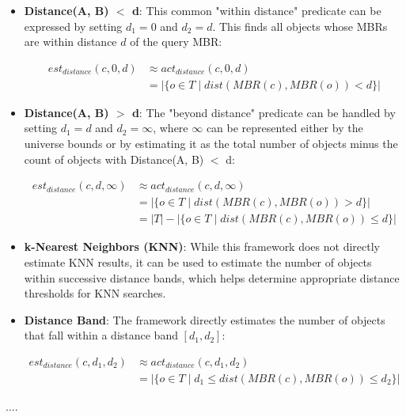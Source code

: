\documentclass{article}
\begin{document}
\begin{itemize}
\item \textbf{Distance(A, B) $<$ d}: This common "within distance" predicate can be expressed by setting $d_1 = 0$ and $d_2 = d$. This finds all objects whose MBRs are within distance $d$ of the query MBR:

\begin{align}
est_{distance}(c, 0, d) &\approx act_{distance}(c, 0, d) \\
&= |\{o \in T \mid dist(MBR(c), MBR(o)) < d\}|
\end{align}

\item \textbf{Distance(A, B) $>$ d}: The "beyond distance" predicate can be handled by setting $d_1 = d$ and $d_2 = \infty$, where $\infty$ can be represented either by the universe bounds or by estimating it as the total number of objects minus the count of objects with Distance(A, B) $<$ d:

\begin{align}
est_{distance}(c, d, \infty) &\approx act_{distance}(c, d, \infty) \\
&= |\{o \in T \mid dist(MBR(c), MBR(o)) > d\}| \\
&= |T| - |\{o \in T \mid dist(MBR(c), MBR(o)) \leq d\}|
\end{align}

\item \textbf{k-Nearest Neighbors (KNN)}: While this framework does not directly estimate KNN results, it can be used to estimate the number of objects within successive distance bands, which helps determine appropriate distance thresholds for KNN searches.

\item \textbf{Distance Band}: The framework directly estimates the number of objects that fall within a distance band $[d_1,d_2]$:

\begin{align}
est_{distance}(c, d_1, d_2) &\approx act_{distance}(c, d_1, d_2) \\
&= |\{o \in T \mid d_1 \leq dist(MBR(c), MBR(o)) \leq d_2\}|
\end{align}
\end{itemize}


....
\end{document}
